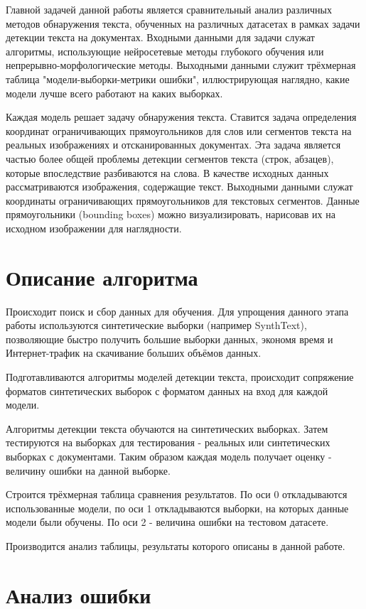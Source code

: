 \documentclass[12pt,twoside]{article}
\begin{document}
Главной задачей данной работы является сравнительный анализ различных методов обнаружения текста, обученных на различных датасетах в рамках задачи детекции текста на документах. Входными данными для задачи служат алгоритмы, использующие нейросетевые методы глубокого обучения или непрерывно-морфологические методы. Выходными данными служит трёхмерная таблица "модели-выборки-метрики ошибки", иллюстрирующая наглядно, какие модели лучше всего работают на каких выборках. 

Каждая модель решает задачу обнаружения текста. Ставится задача определения координат ограничивающих прямоугольников для слов или сегментов текста на реальных изображениях и отсканированных документах. Эта задача является частью более общей проблемы детекции сегментов текста (строк, абзацев), которые впоследствие разбиваются на слова. В качестве исходных данных рассматриваются изображения, содержащие текст. Выходными данными служат координаты ограничивающих прямоугольников для текстовых сегментов. Данные прямоугольники (bounding boxes) можно визуализировать, нарисовав их на исходном изображении для наглядности.

\section{Описание алгоритма}

Происходит поиск и сбор данных для обучения. Для упрощения данного этапа работы используются синтетические выборки (например SynthText), позволяющие быстро получить большие выборки данных, экономя время и Интернет-трафик на скачивание больших объёмов данных.

Подготавливаются алгоритмы моделей детекции текста, происходит сопряжение форматов синтетических выборок с форматом данных на вход для каждой модели. 

Алгоритмы детекции текста обучаются на синтетических выборках. Затем тестируются на выборках для тестирования - реальных или синтетических выборках с документами. Таким образом каждая модель получает оценку - величину ошибки на данной выборке. 

Строится трёхмерная таблица сравнения результатов. По оси 0 откладываются использованные модели, по оси 1 откладываются выборки, на которых данные модели были обучены. По оси 2 - величина ошибки на тестовом датасете.

Производится анализ таблицы, результаты которого описаны в данной работе.

\section{Анализ ошибки}
\end{document}

